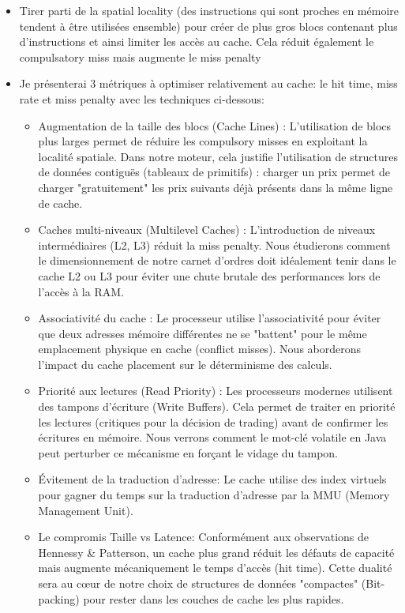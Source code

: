 \begin{itemize}
    \item Tirer parti de la spatial locality (des instructions qui sont proches en mémoire tendent à être utilisées ensemble) pour créer de plus gros blocs contenant plus d’instructions et ainsi limiter les accès au cache. Cela réduit également le compulsatory miss mais augmente le miss penalty
    \item Je présenterai 3 métriques à optimiser relativement au cache: le hit time, miss rate et miss penalty avec les techniques ci-dessous:
    \begin{itemize}
        \item Augmentation de la taille des blocs (Cache Lines) : L'utilisation de blocs plus larges permet de réduire les compulsory misses en exploitant la localité spatiale. Dans notre moteur, cela justifie l'utilisation de structures de données contiguës (tableaux de primitifs) : charger un prix permet de charger "gratuitement" les prix suivants déjà présents dans la même ligne de cache.
        \item Caches multi-niveaux (Multilevel Caches) : L'introduction de niveaux intermédiaires (L2, L3) réduit la miss penalty. Nous étudierons comment le dimensionnement de notre carnet d'ordres doit idéalement tenir dans le cache L2 ou L3 pour éviter une chute brutale des performances lors de l'accès à la RAM.
        \item Associativité du cache : Le processeur utilise l'associativité pour éviter que deux adresses mémoire différentes ne se "battent" pour le même emplacement physique en cache (conflict misses). Nous aborderons l'impact du cache placement sur le déterminisme des calculs.
        \item Priorité aux lectures (Read Priority) : Les processeurs modernes utilisent des tampons d'écriture (Write Buffers). Cela permet de traiter en priorité les lectures (critiques pour la décision de trading) avant de confirmer les écritures en mémoire. Nous verrons comment le mot-clé volatile en Java peut perturber ce mécanisme en forçant le vidage du tampon.
        \item Évitement de la traduction d'adresse: Le cache utilise des index virtuels pour gagner du temps sur la traduction d'adresse par la MMU (Memory Management Unit).
        \item Le compromis Taille vs Latence: Conformément aux observations de Hennessy \& Patterson, un cache plus grand réduit les défauts de capacité mais augmente mécaniquement le temps d'accès (hit time). Cette dualité sera au cœur de notre choix de structures de données "compactes" (Bit-packing) pour rester dans les couches de cache les plus rapides.
    \end{itemize}
\end{itemize}

